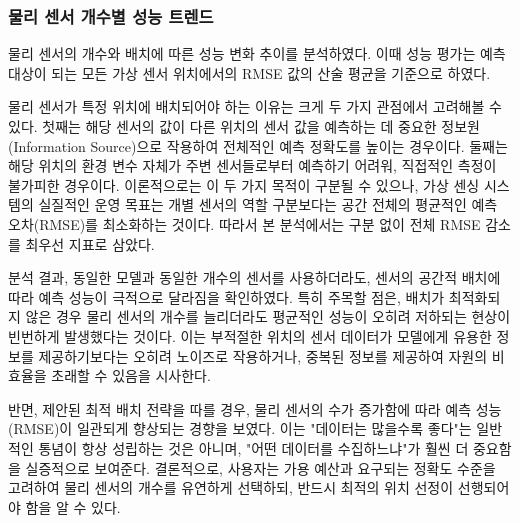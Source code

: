 \documentclass[final,5p,times,twocolumn,authoryear]{elsarticle}
\begin{document}
\subsubsection{물리 센서 개수별 성능 트렌드}
물리 센서의 개수와 배치에 따른 성능 변화 추이를 분석하였다. 이때 성능 평가는 예측 대상이 되는 모든 가상 센서 위치에서의 RMSE 값의 산술 평균을 기준으로 하였다.

물리 센서가 특정 위치에 배치되어야 하는 이유는 크게 두 가지 관점에서 고려해볼 수 있다. 첫째는 해당 센서의 값이 다른 위치의 센서 값을 예측하는 데 중요한 정보원(Information Source)으로 작용하여 전체적인 예측 정확도를 높이는 경우이다. 둘째는 해당 위치의 환경 변수 자체가 주변 센서들로부터 예측하기 어려워, 직접적인 측정이 불가피한 경우이다. 이론적으로는 이 두 가지 목적이 구분될 수 있으나, 가상 센싱 시스템의 실질적인 운영 목표는 개별 센서의 역할 구분보다는 공간 전체의 평균적인 예측 오차(RMSE)를 최소화하는 것이다. 따라서 본 분석에서는 구분 없이 전체 RMSE 감소를 최우선 지표로 삼았다.


분석 결과, 동일한 모델과 동일한 개수의 센서를 사용하더라도, 센서의 공간적 배치에 따라 예측 성능이 극적으로 달라짐을 확인하였다. 특히 주목할 점은, 배치가 최적화되지 않은 경우 물리 센서의 개수를 늘리더라도 평균적인 성능이 오히려 저하되는 현상이 빈번하게 발생했다는 것이다. 이는 부적절한 위치의 센서 데이터가 모델에게 유용한 정보를 제공하기보다는 오히려 노이즈로 작용하거나, 중복된 정보를 제공하여 자원의 비효율을 초래할 수 있음을 시사한다.

반면, 제안된 최적 배치 전략을 따를 경우, 물리 센서의 수가 증가함에 따라 예측 성능(RMSE)이 일관되게 향상되는 경향을 보였다. 이는 "데이터는 많을수록 좋다"는 일반적인 통념이 항상 성립하는 것은 아니며, "어떤 데이터를 수집하느냐"가 훨씬 더 중요함을 실증적으로 보여준다. 결론적으로, 사용자는 가용 예산과 요구되는 정확도 수준을 고려하여 물리 센서의 개수를 유연하게 선택하되, 반드시 최적의 위치 선정이 선행되어야 함을 알 수 있다.

\end{document}
